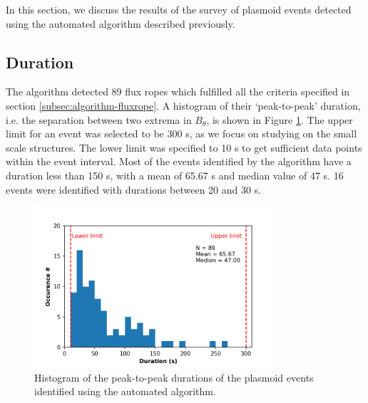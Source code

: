 In this section, we discuss the results of the survey of plasmoid events detected using the automated algorithm described previously. 

\subsection{Duration}

The algorithm detected 89 flux ropes which fulfilled all the criteria specified in section \ref{subsec:algorithm-fluxrope}. A histogram of their `peak-to-peak' duration, i.e. the separation between two extrema in $B_\theta$, is shown in Figure \ref{fig:duration-histogram}. The upper limit for an event was selected to be 300 s, as we focus on studying on the small scale structures. The lower limit was specified to 10 s to get sufficient data points within the event interval. Most of the events identified by the algorithm have a duration less than 150 s, with a mean of 65.67 s and median value of 47 s. 16 events were identified with durations between 20 and 30 s. 

\begin{figure}
    \centering
    \includegraphics[width=0.8\textwidth]{images6/duration_histogram.png}
    \caption{Histogram of the peak-to-peak durations of the plasmoid events identified using the automated algorithm. }
    \label{fig:duration-histogram}
\end{figure}

